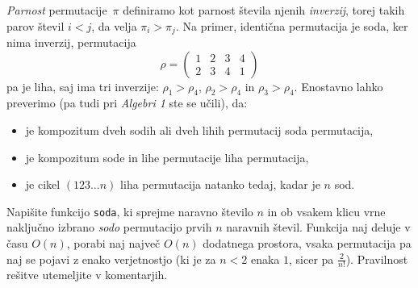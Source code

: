 \documentclass[arhiv]{../izpit}
\begin{document}
  \emph{Parnost} permutacije~$\pi$ definiramo kot parnost števila njenih \emph{inverzij}, torej takih parov števil $i < j$, da velja $\pi_i > \pi_j$. Na primer, identična permutacija je soda, ker nima inverzij, permutacija
  \[
    \rho = \begin{pmatrix}1 & 2 & 3 & 4 \\ 2 & 3 & 4 & 1 \end{pmatrix}
  \]
  pa je liha, saj ima tri inverzije: $\rho_1 > \rho_4$, $\rho_2 > \rho_4$ in $\rho_3 > \rho_4$. Enostavno lahko preverimo (pa tudi pri \emph{Algebri 1} ste se učili), da:
  \begin{itemize}
    \item je kompozitum dveh sodih ali dveh lihih permutacij soda permutacija,
    \item je kompozitum sode in lihe permutacije liha permutacija,
    \item je cikel $(1 2 3 \dots n)$ liha permutacija natanko tedaj, kadar je $n$ sod.
  \end{itemize}

  Napišite funkcijo \verb|soda|, ki sprejme naravno število $n$ in ob vsakem klicu vrne naključno izbrano \emph{sodo} permutacijo prvih $n$ naravnih števil. Funkcija naj deluje v času $O(n)$, porabi naj največ $O(n)$ dodatnega prostora, vsaka permutacija pa naj se pojavi z enako verjetnostjo (ki je za $n < 2$ enaka $1$, sicer pa $\frac{2}{n!}$). Pravilnost rešitve utemeljite v komentarjih.
\end{document}
